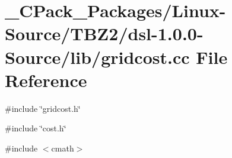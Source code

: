 \section{\_\-CPack\_\-Packages/Linux-\/Source/TBZ2/dsl-\/1.0.0-\/Source/lib/gridcost.cc File Reference}
\label{__CPack__Packages_2Linux-Source_2TBZ2_2dsl-1_80_80-Source_2lib_2gridcost_8cc}
{\ttfamily \#include \char`\"{}gridcost.h\char`\"{}}\par
{\ttfamily \#include \char`\"{}cost.h\char`\"{}}\par
{\ttfamily \#include $<$cmath$>$}\par
